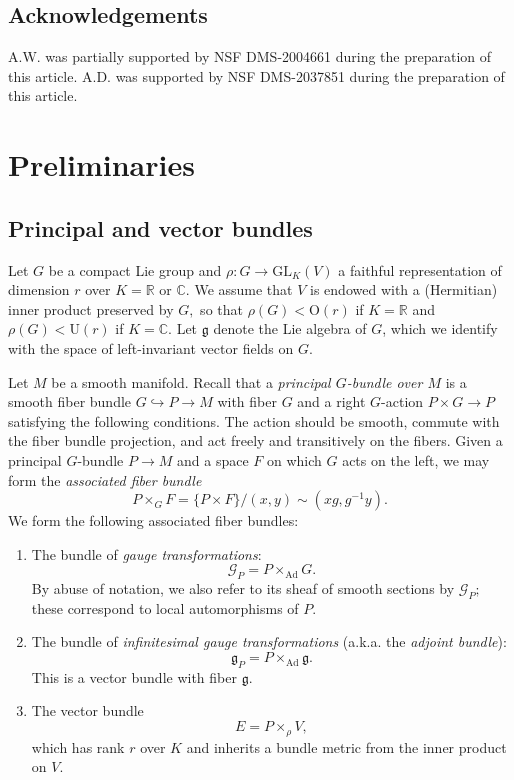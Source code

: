 \documentclass[12pt]{amsart}
\renewcommand{\O}{\mathrm{O}}
\newcommand{\C}{{\mathbb C}}
\renewcommand{\1}{{\mathbf 1}}
\newcommand{\R}{{\mathbb R}}
\DeclareMathOperator{\Ad}{Ad}
\newcommand{\U}{{\mathrm U}}
\newcommand{\GL}{{\mathrm{GL} }}
\newcommand{\gothg}{{\mathfrak g}}
\theoremstyle{others}
\numberwithin{equation}{section}
\newcommand{\inj}{\hookrightarrow}
\begin{document}


\vspace{5mm}




\subsection{Acknowledgements} A.W. was partially supported by NSF DMS-2004661 during the preparation of this article. A.D. was supported by NSF DMS-2037851 during the preparation of this article.

\vspace{10mm}


\section{Preliminaries}\label{section:Preliminaries}

\subsection{Principal and vector bundles} Let $G$ be a compact Lie group and $\rho : G \to \GL_K(V)$ a faithful representation of dimension $r$ over $K = \R$ or $\C.$ We assume that $V$ is endowed with a (Hermitian) inner product preserved by $G,$ so that $\rho(G) < \O(r)$ if $K = \R$ and $\rho(G) < \U(r)$ if $K = \C.$ Let $\gothg$ denote the Lie algebra of $G$, which we identify with the space of left-invariant vector fields on \(G.\)

Let $M$ be a smooth manifold. Recall that a \emph{principal $G$-bundle over $M$} is a smooth fiber bundle $G \inj P \to M$ with fiber \(G\) and a right $G$-action \(P \times G \to P\) satisfying the following conditions. The action should be smooth, commute with the fiber bundle projection, and act freely and transitively on the fibers. Given a principal $G$-bundle $P \to M$ and a space $F$ on which $G$ acts on the left, we may form the \emph{associated fiber bundle}
$$P \times _G F = \{ P \times F \} / \left( x,y \right) \sim \left( x g, g^{-1} y \right).$$
We form the following associated fiber bundles:
\begin{enumerate}
\item The bundle of \emph{gauge transformations}:
$$\mathcal{G}_P = P \times_{\Ad} G.$$
By abuse of notation, we also refer to its sheaf of smooth sections by $\mathcal{G}_P;$ these correspond to local automorphisms of $P.$

\item The bundle of \emph{infinitesimal gauge transformations} (a.k.a. the \emph{adjoint bundle}):
$$\gothg_P = P \times_{\mathrm{Ad}} \gothg.$$
This is a vector bundle with fiber $\gothg.$

\item The vector bundle
$$E = P \times_\rho V,$$
which has rank $r$ over $K$ and inherits a bundle metric from the inner product on $V.$
\end{enumerate}
\end{document}
